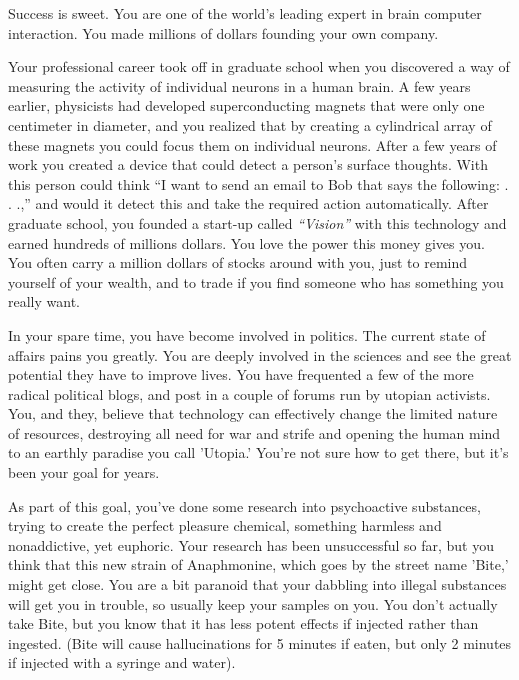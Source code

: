 \documentclass[char]{guildcamp1}
\begin{document}
\name{\cRival{}}


Success is sweet.  You are one of the world's leading expert in brain computer interaction.  You made millions of dollars founding your own company.  

Your professional career took off in graduate school when you discovered a way of measuring the activity of individual neurons in a human brain.  A few years earlier, physicists had developed superconducting magnets that were only one centimeter in diameter, and you realized that by creating a cylindrical array of these magnets you could focus them on individual neurons.  After a few years of work you created a device that could detect a person's surface thoughts. With this person could think ``I want to send an email to Bob that says the following: . . .,'' and would it detect this and take the required action automatically.  After graduate school, you founded a start-up called {\em ``Vision''} with this technology and earned hundreds of  millions dollars.  You love the power this money gives you.  You often carry a million dollars of stocks around with you, just to remind yourself of your wealth, and to trade if you find someone who has something you really want.

In your spare time, you have become involved in politics.  The current state of affairs pains you greatly.  You are deeply involved in the sciences and see the great potential they have to improve lives. You have frequented a few of the more radical political blogs, and post in a couple of forums run by utopian activists. You, and they, believe that technology can effectively change the limited nature of resources, destroying all need for war and strife and opening the human mind to an earthly paradise you call 'Utopia.' You're not sure how to get there, but it's been your goal for years.

As part of this goal, you've done some research into psychoactive substances, trying to create the perfect pleasure chemical, something harmless and nonaddictive, yet euphoric. Your research has been unsuccessful so far, but you think that this new strain of Anaphmonine, which goes by the street name 'Bite,' might get close. You are a bit paranoid that your dabbling into illegal substances will get you in trouble, so usually keep your samples on you. You don't actually take Bite, but you know that it has less potent effects if injected rather than ingested. (Bite will cause hallucinations for 5 minutes if eaten, but only 2 minutes if injected with a syringe and water).
\end{document}
